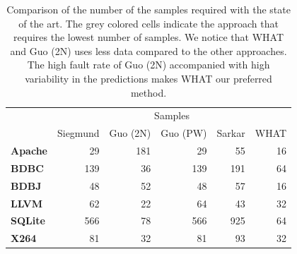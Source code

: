\documentclass[smallextended]{svjour3}       %
\begin{document}
\begin{table}[t]
\caption{Comparison of the number of the samples
required with the state of the art. The grey colored cells indicate the approach that requires the lowest number of samples.  We notice that WHAT and Guo (2N) uses less data compared to the other approaches. The high fault rate  of Guo (2N) accompanied with high variability in the predictions makes WHAT our preferred method.}\label{tab:measurements}
\vspace{2ex}
\centering
\small
\begin{tabular}{lrrrrr}
\toprule
                                   & \multicolumn{5}{c}{{Samples}}                                                                         \\ \cmidrule{2-6} 
\multirow{-2}{*}{\textbf{}} & {Siegmund} & {Guo (2N)}          & {Guo (PW)} & {Sarkar} & {WHAT}                \\ \midrule
\textbf{Apache}                    & 29                & 181                        & 29                & 55              & \cellcolor[HTML]{C0C0C0}16 \\ 
\textbf{BDBC}                      & 139               & \cellcolor[HTML]{C0C0C0}36 & 139               & 191             & 64                         \\ 
\textbf{BDBJ}                      & 48                & 52                         & 48                & 57              & \cellcolor[HTML]{C0C0C0}16 \\ 
\textbf{LLVM}                      & 62                & \cellcolor[HTML]{C0C0C0}22 & 64                & 43              & 32                         \\ 
\textbf{SQLite}                    & 566               & 78                         & 566               & 925             & \cellcolor[HTML]{C0C0C0}64 \\ 
\textbf{X264}                      & 81                & \cellcolor[HTML]{C0C0C0}32 & 81                & 93              & \cellcolor[HTML]{C0C0C0}32 \\ \bottomrule
\end{tabular}
\end{table}

% 

% 
\end{document}
